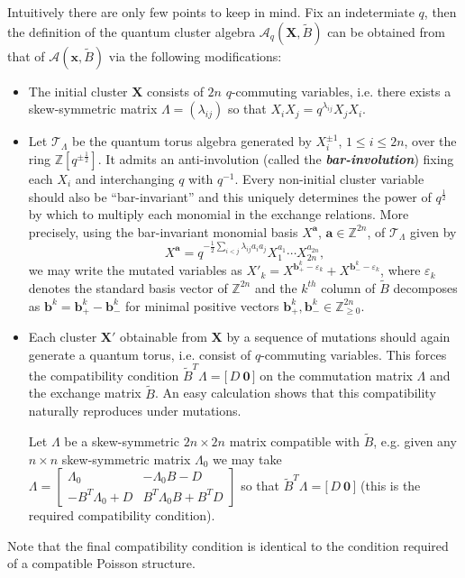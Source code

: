 \documentclass[12pt]{amsart}
\newcommand{\bfa}{\mathbf{a}}
\newcommand{\bfb}{\mathbf{b}}
\newcommand{\bfx}{\mathbf{x}}
\newcommand{\bfX}{\mathbf{X}}
\newcommand{\cA}{\mathcal{A}}
\newcommand{\cT}{\mathcal{T}}
\newcommand{\half}{{\frac{1}{2}}}
\newcommand{\ZZ}{\mathbb{Z}}
\newcommand{\newword}[1]{\textbf{\emph{#1}}}
\begin{document}
  Intuitively there are only few points to keep in mind.
  Fix an indetermiate $q$, then the definition of the quantum cluster algebra $\cA_q(\bfX,\widetilde B)$ can be obtained from that of $\cA(\bfx,\widetilde B)$ via the following modifications:
  \begin{itemize}
    \item 
      The initial cluster $\bfX$ consists of $2n$ $q$-commuting variables, i.e. there exists a skew-symmetric matrix $\Lambda=(\lambda_{ij})$ so that $X_iX_j=q^{\lambda_{ij}}X_jX_i$.  
    
    \item 
      Let $\cT_\Lambda$ be the quantum torus algebra generated by $X_i^{\pm1}$, $1\le i\le 2n$, over the ring $\ZZ[q^{\pm\half}]$.
      It admits an anti-involution (called the \newword{bar-involution}) fixing each $X_i$ and interchanging $q$ with $q^{-1}$.
      Every non-initial cluster variable should also be ``bar-invariant'' and this uniquely determines the power of $q^\half$ by which to multiply each monomial in the exchange relations.  
      More precisely, using the bar-invariant monomial basis $X^\bfa$, $\bfa\in\ZZ^{2n}$, of $\cT_\Lambda$ given by
      \[
        X^\bfa=q^{-\half\sum\limits_{i<j}\lambda_{ij}a_ia_j}X_1^{a_1}\cdots X_{2n}^{a_{2n}},
      \]
      we may write the mutated variables as $X'_k=X^{\bfb_+^k-\varepsilon_k}+X^{\bfb_-^k-\varepsilon_k}$, where $\varepsilon_k$ denotes the standard basis vector of $\ZZ^{2n}$ and the $k^{th}$ column of $\widetilde{B}$ decomposes as $\bfb^k=\bfb^k_+-\bfb^k_-$ for minimal positive vectors $\bfb^k_+,\bfb^k_-\in\ZZ_{\ge0}^{2n}$.

    \item 
      Each cluster $\bfX'$ obtainable from $\bfX$ by a sequence of mutations should again generate a quantum torus, i.e. consist of $q$-commuting variables.
      This forces the compatibility condition $\tilde B^T\Lambda=\big[\,D\ \boldsymbol{0}\,\big]$ on the commutation matrix $\Lambda$ and the exchange matrix $\tilde B$.
    An easy calculation shows that this compatibility naturally reproduces under mutations.


    Let $\Lambda$ be a skew-symmetric $2n\times2n$ matrix compatible with $\tilde B$, e.g. given any $n\times n$ skew-symmetric matrix $\Lambda_0$ we may take $\Lambda=\left[\begin{array}{cc}\Lambda_0 & -\Lambda_0B-D\\ -B^T\Lambda_0+D & B^T\Lambda_0B+B^TD\end{array}\right]$ so that $\tilde B^T\Lambda=\big[\,D\ \boldsymbol{0}\,\big]$ (this is the required compatibility condition).

  \end{itemize}
  Note that the final compatibility condition is identical to the condition required of a compatible Poisson structure.
  
\end{document}
